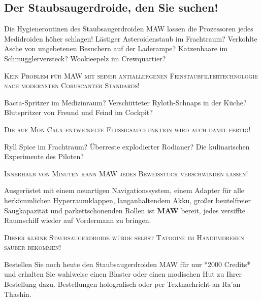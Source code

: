 \documentclass[final]{multiversum}
\begin{document}
\subsection{Der Staubsaugerdroide, den Sie suchen!}

Die Hygieneroutinen des Staubsaugerdroiden MAW lassen die Prozessoren jedes Medidroiden höher schlagen!
Lästiger Asteroidenstaub im Frachtraum?
Verkohlte Asche von ungebetenen Besuchern auf der Laderampe?
Katzenhaare im Schmugglerversteck? Wookieepelz im Crewquartier?\\
\begin{center}\textsc{Kein Problem für MAW mit seiner antiallergenen Feinstaubfiltertechnologie nach modernsten Coruscanter Standards!}\\\end{center}
Bacta-Spritzer im Medizinraum?
Verschütteter Ryloth-Schnaps in der Küche?
Blutspritzer von Freund und Feind im Cockpit?\\
\begin{center}\textsc{Die auf Mon Cala entwickelte Flüssigsaugfunktion wird auch damit fertig!}\\\end{center}
Ryll Spice im Frachtraum?
Überreste explodierter Rodianer?
Die kulinarischen Experimente des Piloten?
\begin{center}\textsc{Innerhalb von Minuten kann MAW jedes Beweisstück verschwinden lassen!}\\\end{center}
Ausgerüstet mit einem neuartigen Navigationssystem, einem Adapter für alle herkömmlichen Hyperraumklappen, langanhaltendem Akku, großer beutelfreier Saugkapazität und parkettschonenden Rollen ist \textbf{MAW} bereit, jedes versiffte Raumschiff wieder auf Vordermann zu bringen.
\begin{center}\textsc{Dieser kleine Staubsaugerdroide würde selbst Tatooine im Handumdrehen sauber bekommen!}\\\end{center}
Bestellen Sie noch heute den Staubsaugerdroiden MAW für nur *2000 Credits* und erhalten Sie wahlweise einen Blaster oder einen modischen Hut zu Ihrer Bestellung dazu. 
Bestellungen holografisch oder per Textnachricht an Ra'an Thashin.\\
\end{document}
